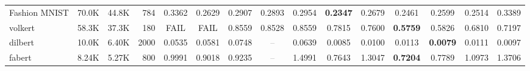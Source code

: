 \begin{table}[t]
{\begin{tabular}{lrrrccccccccccc}
Fashion MNIST & 70.0K & 44.8K & 784 & \cellcolor[HTML]{F5CECC}0.3362 & \cellcolor[HTML]{EEEECF}0.2629 & \cellcolor[HTML]{FEEFCC}0.2907 & \cellcolor[HTML]{FEF0CC}0.2893 & \cellcolor[HTML]{FDECCC}0.2954 & \cellcolor[HTML]{D9EAD3}\textbf{0.2347} & \cellcolor[HTML]{F1EFCF}0.2679 & \cellcolor[HTML]{E1ECD1}0.2461 & \cellcolor[HTML]{EBEED0}0.2599 & \cellcolor[HTML]{E5EDD1}0.2514 & \cellcolor[HTML]{F4CCCC}0.3389 \\
volkert & 58.3K & 37.3K & 180 & \textcolor{red!70!black}{FAIL} & \textcolor{red!70!black}{FAIL} & \cellcolor[HTML]{F4CCCC}0.8559 & \cellcolor[HTML]{F4CDCC}0.8528 & \cellcolor[HTML]{F4CCCC}0.8559 & \cellcolor[HTML]{FAE0CC}0.7815 & \cellcolor[HTML]{FCE6CC}0.7600 & \cellcolor[HTML]{D9EAD3}\textbf{0.5759} & \cellcolor[HTML]{DBEAD3}0.5826 & \cellcolor[HTML]{F6F0CE}0.6810 & \cellcolor[HTML]{FFF1CC}0.7197 \\
dilbert & 10.0K & 6.40K & 2000 & \cellcolor[HTML]{FBE4CC}0.0535 & \cellcolor[HTML]{F9DFCC}0.0581 & \cellcolor[HTML]{F4CCCC}0.0748 & \textcolor{gray}{--} & \cellcolor[HTML]{F8D8CC}0.0639 & \cellcolor[HTML]{DAEAD3}0.0085 & \cellcolor[HTML]{DBEBD3}0.0100 & \cellcolor[HTML]{DDEBD2}0.0113 & \cellcolor[HTML]{D9EAD3}\textbf{0.0079} & \cellcolor[HTML]{DDEBD2}0.0111 & \cellcolor[HTML]{DBEAD3}0.0097 \\
fabert & 8.24K & 5.27K & 800 & \cellcolor[HTML]{F4F0CE}0.9991 & \cellcolor[HTML]{EBEED0}0.9018 & \cellcolor[HTML]{EDEECF}0.9235 & \textcolor{gray}{--} & \cellcolor[HTML]{F4CCCC}1.4991 & \cellcolor[HTML]{DDEBD2}0.7643 & \cellcolor[HTML]{F9DFCC}1.3047 & \cellcolor[HTML]{D9EAD3}\textbf{0.7204} & \cellcolor[HTML]{DFEBD2}0.7789 & \cellcolor[HTML]{FEF2CC}1.0973 & \cellcolor[HTML]{F8D9CC}1.3706 \\
\bottomrule
\end{tabular}%
}
\vspace{2pt}
\begin{minipage}{0.99\textwidth}
\end{minipage}
\end{table}